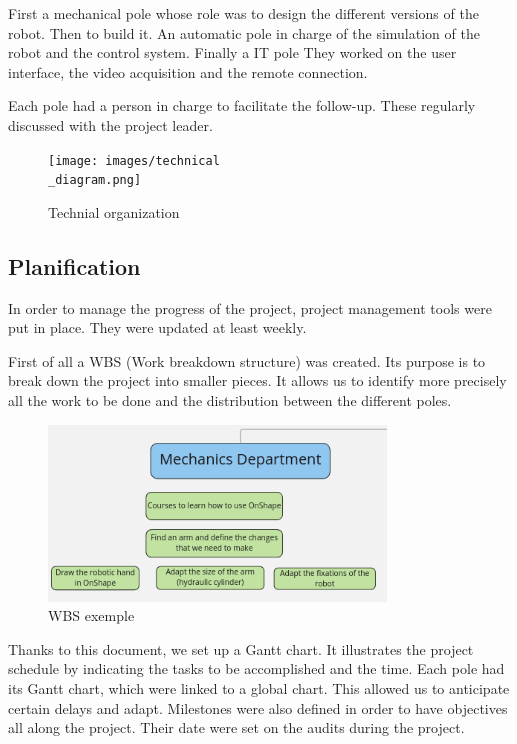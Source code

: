 \bigbreak

First a mechanical pole whose role was to design the different versions of the robot. Then to build it. An automatic pole in charge of the simulation of the robot and the control system. Finally a IT pole They worked on the user interface, the video acquisition and the remote connection.

\bigbreak

Each pole had a person in charge to facilitate the follow-up. These regularly discussed with the project leader.

\begin{figure}[ht]
    \centering
    \texttt{[image: images/technical\\\_diagram.png]}
    \caption{Technial organization}
    \label{fig:mesh3}
\end{figure}
\FloatBarrier

\subsection{Planification}

\hspace{\parindent} In order to manage the progress of the project, project management tools were put in place. They were updated at least weekly.

\bigbreak

First of all a WBS (Work breakdown structure) was created. Its purpose is to break down the project into smaller pieces. It allows us to identify more precisely all the work to be done and the distribution between the different poles. 

\begin{figure}[ht]
    \centering
    \includegraphics[width=0.8\textwidth]{images/wbs.png}
    \caption{WBS exemple}
    \label{fig:mesh4}
\end{figure}
\FloatBarrier

\bigbreak

Thanks to this document, we set up a Gantt chart. It illustrates the project schedule by indicating the tasks to be accomplished and the time. Each pole had its Gantt chart, which were linked to a global chart. This allowed us to anticipate certain delays and adapt. Milestones were also defined in order to have objectives all along the project. Their date were set on the audits during the project.


